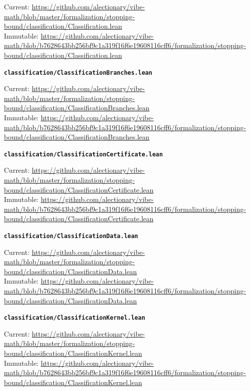 {\footnotesize\noindent Current: \url{https://github.com/alectionary/vibe-math/blob/master/formalization/stopping-bound/classification/Classification.lean}\\
Immutable: \url{https://github.com/alectionary/vibe-math/blob/b7628643bb256bf9c1a319f16f6e19608116cff6/formalization/stopping-bound/classification/Classification.lean}\par}
\smallskip
\medskip
\par\noindent\textbf{\texttt{classification/ClassificationBranches.lean}}\par\nopagebreak
{\footnotesize\noindent Current: \url{https://github.com/alectionary/vibe-math/blob/master/formalization/stopping-bound/classification/ClassificationBranches.lean}\\
Immutable: \url{https://github.com/alectionary/vibe-math/blob/b7628643bb256bf9c1a319f16f6e19608116cff6/formalization/stopping-bound/classification/ClassificationBranches.lean}\par}
\smallskip
\medskip
\par\noindent\textbf{\texttt{classification/ClassificationCertificate.lean}}\par\nopagebreak
{\footnotesize\noindent Current: \url{https://github.com/alectionary/vibe-math/blob/master/formalization/stopping-bound/classification/ClassificationCertificate.lean}\\
Immutable: \url{https://github.com/alectionary/vibe-math/blob/b7628643bb256bf9c1a319f16f6e19608116cff6/formalization/stopping-bound/classification/ClassificationCertificate.lean}\par}
\smallskip
\medskip
\par\noindent\textbf{\texttt{classification/ClassificationData.lean}}\par\nopagebreak
{\footnotesize\noindent Current: \url{https://github.com/alectionary/vibe-math/blob/master/formalization/stopping-bound/classification/ClassificationData.lean}\\
Immutable: \url{https://github.com/alectionary/vibe-math/blob/b7628643bb256bf9c1a319f16f6e19608116cff6/formalization/stopping-bound/classification/ClassificationData.lean}\par}
\smallskip
\medskip
\par\noindent\textbf{\texttt{classification/ClassificationKernel.lean}}\par\nopagebreak
{\footnotesize\noindent Current: \url{https://github.com/alectionary/vibe-math/blob/master/formalization/stopping-bound/classification/ClassificationKernel.lean}\\
Immutable: \url{https://github.com/alectionary/vibe-math/blob/b7628643bb256bf9c1a319f16f6e19608116cff6/formalization/stopping-bound/classification/ClassificationKernel.lean}\par}
